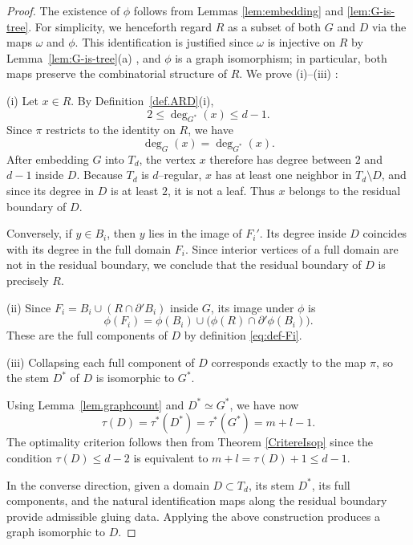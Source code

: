 \documentclass[a4paper, 11pt]{article}
\numberwithin{equation}{section}
\theoremstyle{definition}
\theoremstyle{remark}
\begin{document}
\begin{proof}
The existence of  $\phi$ follows from Lemmas \ref{lem:embedding}  and \ref{lem:G-is-tree}. 
For simplicity, we henceforth regard $R$ as a subset of both $G$ and $D$ via 
the maps $\omega$ and $\phi$. This identification is justified since 
$\omega$ is injective on $R$ by Lemma~\ref{lem:G-is-tree}(a)
, and $\phi$ is a graph 
isomorphism; in particular, both maps preserve the combinatorial 
structure of $R$.
We prove (i)--(iii) : 

\smallskip 


(i) 
Let $x\in R$. By Definition~\ref{def.ARD}(i),
\[
2 \le \deg_{G^*}(x) \le d-1.
\]
Since $\pi$ restricts to the identity on $R$, we have
\[
\deg_G(x)=\deg_{G^*}(x).
\]
After embedding $G$ into $T_d$, the vertex $x$ therefore has degree between $2$ and $d-1$ inside $D$.
Because $T_d$ is $d$–regular, $x$ has at least one neighbor in $T_d\setminus D$, and since its degree in $D$ is at least $2$, it is not a leaf. Thus $x$ belongs to the residual boundary of $D$.

\smallskip

Conversely, if $y\in B_i$, then $y$ lies in the image of $F_i'$. Its degree inside $D$ coincides with its degree in the full domain $F_i$. Since interior vertices of a full domain are not in the residual boundary, we conclude that the residual boundary of $D$ is precisely $R$.

\smallskip

(ii)  Since $F_i = B_i \cup (R \cap \partial' B_i)$ inside $G$, its image under $\phi$ is
$$
 \phi(F_i)=\phi(B_i)\cup\bigl(\phi(R)\cap\partial'\phi(B_i)\bigr).
$$
These  are the full components of $D$ by definition \eqref{eq:def-Fi}.
 
\smallskip
 

(iii)  
Collapsing each full component of $D$ corresponds exactly to the map $\pi$,
so the stem  $D^*$ of $D$ is isomorphic to $G^*$.

\smallskip

Using Lemma~\ref{lem.graphcount} and $D^* \simeq G^*$, we have now
$$
\tau(D)=\tau^*(D^*) = \tau^*(G^*)=m+l-1.
$$
The optimality criterion follows then from  Theorem \ref{CritereIsop} since the condition 
$\tau(D) \leq d-2$ is equivalent to $m+l =  \tau(D) + 1\le d-1$.

\smallskip

In the converse direction, given  a domain $D\subset T_d$, its stem $D^*$,
its full components, and the natural identification maps along the residual boundary
provide admissible  gluing data.
Applying the above construction produces  a graph isomorphic to $D$.
\end{proof}
\end{document}
